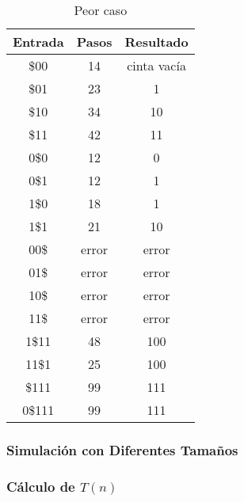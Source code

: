 \documentclass{uc3mpracticas}
\begin{document}
  \begin{table}[!h]
    \centering
  \begin{tabular}{|c|c|c|}
  \hline
  \textbf{Entrada} & \textbf{Pasos} & \textbf{Resultado} \\ \hline
  \$00             & 14             & cinta vacía        \\ \hline
  \$01             & 23             & 1                  \\ \hline
  \$10             & 34             & 10                 \\ \hline
  \$11             & 42             & 11                 \\ \hline
  0\$0             & 12             & 0                  \\ \hline
  0\$1             & 12             & 1                  \\ \hline
  1\$0             & 18             & 1                  \\ \hline
  1\$1             & 21             & 10                 \\ \hline
  00\$             & error          & error              \\ \hline
  01\$             & error          & error              \\ \hline
  10\$             & error          & error              \\ \hline
  11\$             & error          & error              \\ \hline
  1\$11            & 48             & 100                \\ \hline
  11\$1            & 25             & 100                \\ \hline
  \$111            & 99             & 111                \\ \hline
  0\$111           & 99             & 111                \\ \hline
  \end{tabular}
  \caption{Peor caso}
  \end{table}


  \subsubsection{Simulación con Diferentes Tamaños}





  \subsubsection{Cálculo de $T(n)$}
\end{document}
